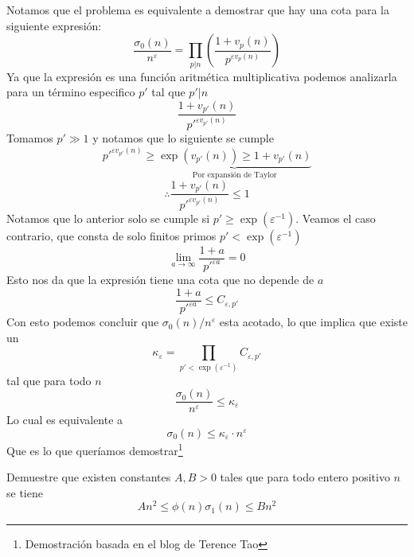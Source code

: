 \begin{sol}
    Notamos que el problema es equivalente a demostrar que hay una cota para la siguiente expresión:
    \[\frac{\sigma_0(n)}{n^\varepsilon}=\prod_{p|n}\left(\frac{1+v_p(n)}{p^{\varepsilon v_p(n)}}\right)\]
    Ya que la expresión es una función aritmética multiplicativa podemos analizarla para un t\'ermino especifico $p'$ tal que $p'|n$
    \[\frac{1+v_{p'}(n)}{p'^{\varepsilon v_{p'}(n)}}\]
    Tomamos $p'\gg 1$ y notamos que lo siguiente se cumple
    \[p'^{\varepsilon v_{p'}(n)}\geq\underbrace{\exp(v_{p'}(n))\geq 1+v_{p'}(n)}_{\text{Por expansión de Taylor}}\]
    \[\therefore \frac{1+v_{p'}(n)}{p'^{\varepsilon v_{p'}(n)}}\leq 1\]
    Notamos que lo anterior solo se cumple si $p'\geq\exp(\varepsilon^{-1})$. Veamos el caso contrario, que consta de solo finitos primos $p' < \exp(\varepsilon^{-1})$
    \[\lim_{a\rightarrow\infty}\frac{1+a}{p'^{\varepsilon a}}=0\]
    Esto nos da que la expresión tiene una cota que no depende de $a$
    \[\frac{1+a}{p'^{\varepsilon a}}\leq C_{\varepsilon,p'}\]
    Con esto podemos concluir que $\sigma_0(n)/n^\varepsilon$ esta acotado, lo que implica que existe un
    \[\kappa_\varepsilon = \displaystyle\prod_{p' < \exp(\varepsilon^{-1})} C_{\varepsilon,p'}\]
    tal que para todo $n$
    \[\frac{\sigma_0(n)}{n^\varepsilon}\leq \kappa_\varepsilon\]
    Lo cual es equivalente a
    \[\sigma_0(n)\leq \kappa_\varepsilon\cdot n^\varepsilon\]
    Que es lo que queríamos demostrar\footnote{Demostración basada en el blog de Terence Tao\cite{tao}}
\end{sol}

\begin{prob}[3 pts.]
	Demuestre que existen constantes $A,B > 0$ tales que para todo entero positivo $n$ se tiene
	\[An^2\leq\phi(n)\sigma_1(n)\leq Bn^2\]
\end{prob}

